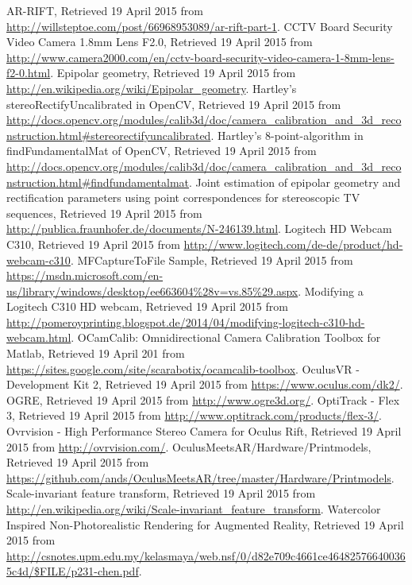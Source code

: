 	\nocite{*}
	\ihead[\leftmark]{\leftmark}
	\begin{thebibliography}{99}

		 AR-RIFT, Retrieved 19 April 2015 from \url{http://willsteptoe.com/post/66968953089/ar-rift-part-1}.
		 CCTV Board Security Video Camera 1.8mm Lens F2.0, Retrieved 19 April 2015 from \url{http://www.camera2000.com/en/cctv-board-security-video-camera-1-8mm-lens-f2-0.html}.
		 Epipolar geometry, Retrieved 19 April 2015 from \url{http://en.wikipedia.org/wiki/Epipolar_geometry}.
		 Hartley's stereoRectifyUncalibrated in OpenCV, Retrieved 19 April 2015 from \url{http://docs.opencv.org/modules/calib3d/doc/camera_calibration_and_3d_reconstruction.html#stereorectifyuncalibrated}.
		 Hartley's 8-point-algorithm in findFundamentalMat of OpenCV, Retrieved 19 April 2015 from \url{http://docs.opencv.org/modules/calib3d/doc/camera_calibration_and_3d_reconstruction.html#findfundamentalmat}.
		 Joint estimation of epipolar geometry and rectification parameters using point correspondences for stereoscopic TV sequences, Retrieved 19 April 2015 from \url{http://publica.fraunhofer.de/documents/N-246139.html}.
		 Logitech HD Webcam C310, Retrieved 19 April 2015 from \url{http://www.logitech.com/de-de/product/hd-webcam-c310}.
		 MFCaptureToFile Sample, Retrieved 19 April 2015 from \url{https://msdn.microsoft.com/en-us/library/windows/desktop/ee663604%28v=vs.85%29.aspx}.
		 Modifying a Logitech C310 HD webcam, Retrieved 19 April 2015 from \url{http://pomeroyprinting.blogspot.de/2014/04/modifying-logitech-c310-hd-webcam.html}.
		 OCamCalib: Omnidirectional Camera Calibration Toolbox for Matlab, Retrieved 19 April 201 from \url{https://sites.google.com/site/scarabotix/ocamcalib-toolbox}.
		 OculusVR - Development Kit 2, Retrieved 19 April 2015 from \url{https://www.oculus.com/dk2/}.
		 OGRE, Retrieved 19 April 2015 from \url{http://www.ogre3d.org/}.
		 OptiTrack - Flex 3, Retrieved 19 April 2015 from \url{http://www.optitrack.com/products/flex-3/}.
		 Ovrvision - High Performance Stereo Camera for Oculus Rift, Retrieved 19 April 2015 from \url{http://ovrvision.com/}.
		 OculusMeetsAR/Hardware/Printmodels, Retrieved 19 April 2015 from \url{https://github.com/ands/OculusMeetsAR/tree/master/Hardware/Printmodels}.
		 Scale-invariant feature transform, Retrieved 19 April 2015 from \url{http://en.wikipedia.org/wiki/Scale-invariant_feature_transform}.
		 Watercolor Inspired Non-Photorealistic Rendering for Augmented Reality, Retrieved 19 April 2015 from \url{http://csnotes.upm.edu.my/kelasmaya/web.nsf/0/d82e709c4661ce464825766400365c4d/$FILE/p231-chen.pdf}.

	\end{thebibliography}


